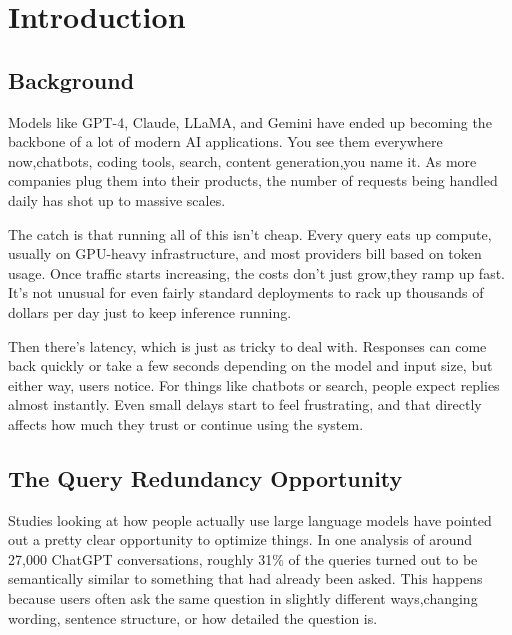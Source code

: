 \documentclass[12pt,a4paper]{report}
\begin{document}
\newpage
{}
\setcounter{page}{1}

\chapter{Introduction}

\section{Background}

Models like GPT-4, Claude, LLaMA, and Gemini have ended up becoming the backbone of a lot of modern AI applications. You see them everywhere now,chatbots, coding tools, search, content generation,you name it. As more companies plug them into their products, the number of requests being handled daily has shot up to massive scales.

The catch is that running all of this isn’t cheap. Every query eats up compute, usually on GPU-heavy infrastructure, and most providers bill based on token usage. Once traffic starts increasing, the costs don’t just grow,they ramp up fast. It’s not unusual for even fairly standard deployments to rack up thousands of dollars per day just to keep inference running.

Then there’s latency, which is just as tricky to deal with. Responses can come back quickly or take a few seconds depending on the model and input size, but either way, users notice. For things like chatbots or search, people expect replies almost instantly. Even small delays start to feel frustrating, and that directly affects how much they trust or continue using the system.


\section{The Query Redundancy Opportunity}

Studies looking at how people actually use large language models have pointed out a pretty clear opportunity to optimize things. In one analysis of around 27,000 ChatGPT conversations, roughly 31\% of the queries turned out to be semantically similar to something that had already been asked. This happens because users often ask the same question in slightly different ways,changing wording, sentence structure, or how detailed the question is.
\end{document}
